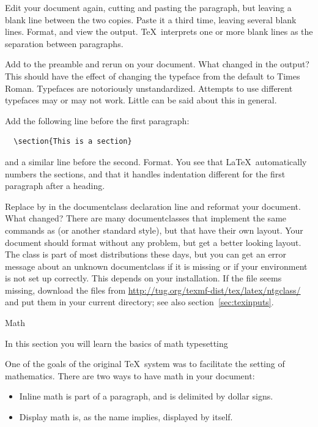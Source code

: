 \practical 
{Edit your document again, cutting and pasting the
  paragraph, but leaving a blank line between the two copies. Paste it
  a third time, leaving several blank lines. Format, and view the
  output.}
{\TeX\ interprets one or more blank lines as the
  separation between paragraphs.}{}

\practical
{Add  to the preamble and rerun
   on your
document. What changed in the output?}
{This should have the effect of changing the typeface from the default
  to Times Roman.}
{Typefaces are notoriously unstandardized. Attempts to use different
  typefaces may or may not work. Little can be said about this in general.}

Add the following line before the first paragraph:
\begin{verbatim}
  \section{This is a section}
\end{verbatim}
and a similar line before the
second. Format. You see that \LaTeX\ automatically numbers the
sections, and that it handles indentation different for the first
paragraph after a heading.

\practical
{Replace  by  in the documentclass declaration line and
reformat your document. What changed?}
{There are many documentclasses that implement the same commands as
   (or another standard style), but that have their own
  layout. Your document should format without any problem, but get a
  better looking layout.}
{The  class is part of most distributions these days, but
  you can get an error message about an unknown documentclass if it is
  missing or if your environment is not set up correctly. This depends
  on your installation. If the file seems missing, download the files
  from \url{http://tug.org/texmf-dist/tex/latex/ntgclass/}
  and put them in your current directory; see also section~\ref{sec:texinputs}.}

 {Math}

\begin{purpose}
  In this section you will learn the basics of math typesetting
\end{purpose}

One of the goals of the original \TeX\ system was to facilitate the
setting of mathematics. There are two ways to have math in your
document:
\begin{itemize}
\item Inline math is part of a paragraph, and is delimited by dollar
  signs. 
\item Display math is, as the name implies, displayed by itself. 
\end{itemize}

